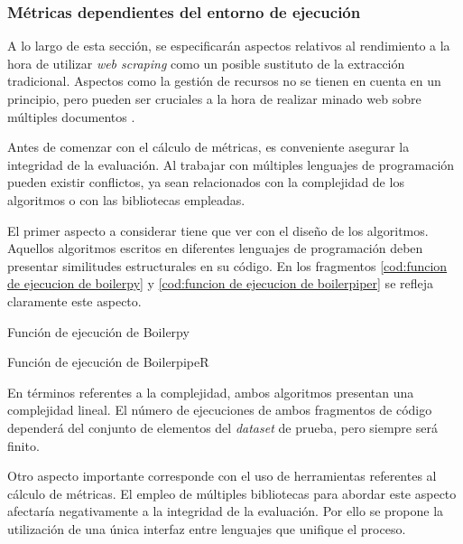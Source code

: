 \subsubsection{Métricas dependientes del entorno de ejecución}
\label{subsubsec:metricas dependientes del entorno de ejecucion}

A lo largo de esta sección, se especificarán aspectos relativos al rendimiento a la hora de utilizar 
\emph{web scraping} como un posible sustituto de la extracción tradicional. Aspectos como la gestión de 
recursos no se tienen en cuenta en un principio, pero pueden ser cruciales a la hora de realizar minado web 
sobre múltiples documentos \cite{emil-persson}.

Antes de comenzar con el cálculo de métricas, es conveniente asegurar la integridad de la evaluación. Al
trabajar con múltiples lenguajes de programación pueden existir conflictos, ya sean relacionados con la 
complejidad de los algoritmos o con las bibliotecas empleadas.

El primer aspecto a considerar tiene que ver con el diseño de los algoritmos. Aquellos algoritmos escritos 
en diferentes lenguajes de programación deben presentar similitudes estructurales en su código. En los 
fragmentos \ref{cod:funcion de ejecucion de boilerpy} y \ref{cod:funcion de ejecucion de boilerpiper} 
se refleja claramente este aspecto.

\begin{codefloat}
  
  \caption{Función de ejecución de Boilerpy}
  \label{cod:funcion de ejecucion de boilerpy}
\end{codefloat}

\begin{codefloat}
  
  \caption{Función de ejecución de BoilerpipeR}
  \label{cod:funcion de ejecucion de boilerpiper}
\end{codefloat}

En términos referentes a la complejidad, ambos algoritmos presentan una complejidad lineal. El número de
ejecuciones de ambos fragmentos de código dependerá del conjunto de elementos del \emph{dataset} de prueba,
pero siempre será finito.

Otro aspecto importante corresponde con el uso de herramientas referentes al cálculo de métricas. El empleo
de múltiples bibliotecas para abordar este aspecto afectaría negativamente a la integridad de la evaluación. 
Por ello se propone la utilización de una única interfaz entre lenguajes que unifique el proceso.


